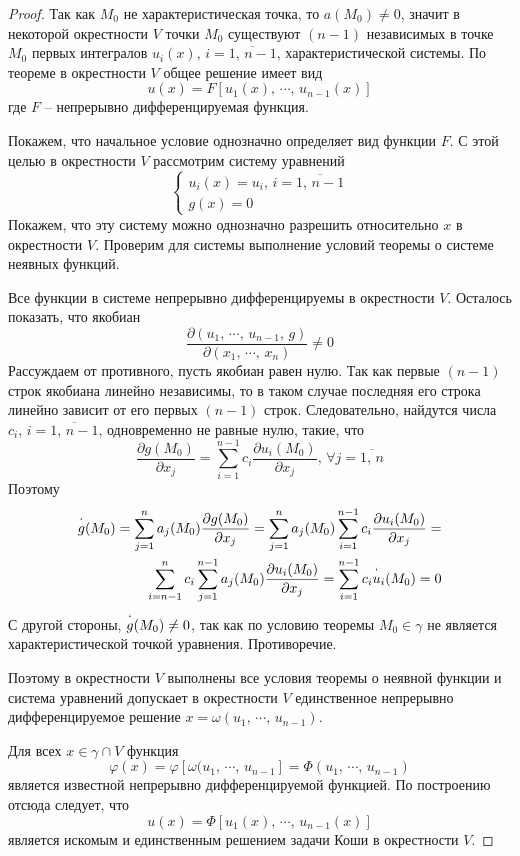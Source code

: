 \documentclass[a4paper,12pt]{article}
\renewcommand{\phi}{\ensuremath{\varphi}}
\theoremstyle{plain}
\theoremstyle{definition}
\theoremstyle{remark}
\begin{document}
\begin{proof}
	Так как $M_0$ не характеристическая точка, то $a(M_0) \neq 0$, значит в некоторой окрестности $V$ точки $M_0$ существуют $(n-1)$ независимых в точке $M_0$ первых интегралов $u_i(x),\, i =\overline{1,\,n-1}$, характеристической системы. По теореме в окрестности $V$ общее решение имеет вид
	\[u(x) = F[u_1(x),\,\cdots,\,u_{n - 1}(x)]\]
	где $F$ -- непрерывно дифференцируемая функция. 
	
	Покажем, что начальное условие однозначно определяет вид функции $F$. С этой целью в окрестности $V$ рассмотрим систему уравнений
	\[\begin{cases}
		u_i(x) = u_i,\, i = \overline{1,\,n-1}\\
		g(x) = 0
	\end{cases}\]
	Покажем, что эту систему можно однозначно разрешить относительно $x$ в окрестности $V$. Проверим для системы выполнение условий теоремы о системе неявных функций.

	Все функции в системе непрерывно дифференцируемы в окрестности $V$. Осталось показать, что якобиан
	\[\frac{\partial(u_1,\,\cdots,\,u_{n-1},\,g)}{\partial(x_1,\,\cdots,\,x_n)} \neq 0\]
	Рассуждаем от противного, пусть якобиан равен нулю. Так как первые $(n-1)$ строк якобиана линейно независимы, то в таком случае последняя его строка линейно зависит от его первых $(n-1)$ строк. Следовательно, найдутся числа $c_i,\, i = \overline{1,\,n-1}$, одновременно не равные нулю, такие, что
	\[\frac{\partial g(M_0)}{\partial x_j} = \sum_{i = 1}^{n-1}c_i\frac{\partial u_i(M_0)}{\partial x_j},\, \forall j = \overline{1,\,n}\]
	Поэтому
	\begin{align*}
		\overset{`}{g}(M_0) = \sum_{j = 1}^n a_j(M_0)\frac{\partial g(M_0)}{\partial x_j} = \sum_{j = 1}^n a_j(M_0)\sum_{i = 1}^{n-1}c_i\frac{\partial u_i(M_0)}{\partial x_j} = \\
		\sum_{i = n-1}^n c_i \sum_{j = 1}^{n-1} a_j(M_0)\frac{\partial u_i(M_0)}{\partial x_j} = \sum_{i = 1}^{n-1}c_i\overset{`}{u}_i(M_0) = 0
	\end{align*}
	С другой стороны, $\overset{`}{g}(M_0) \neq 0$, так как по условию теоремы $M_0 \in \gamma$ не является характеристической точкой уравнения. Противоречие.

	Поэтому в окрестности $V$ выполнены все условия теоремы о неявной функции и система уравнений допускает в окрестности $V$ единственное непрерывно дифференцируемое решение $x = \omega(u_1,\,\cdots,\,u_{n-1})$.

	Для всех $x \in \gamma \cap V$ функция
	\[\phi(x) = \phi[\omega(u_1,\,\cdots,\,u_{n-1}]= \Phi(u_1,\,\cdots,\,u_{n-1})\]
	является известной непрерывно дифференцируемой функцией. По построению отсюда следует, что
	\[u(x) = \Phi[u_1(x),\,\cdots,\,u_{n-1}(x)]\]
	является искомым и единственным решением задачи Коши в окрестности $V$.
\end{proof}
\end{document}
